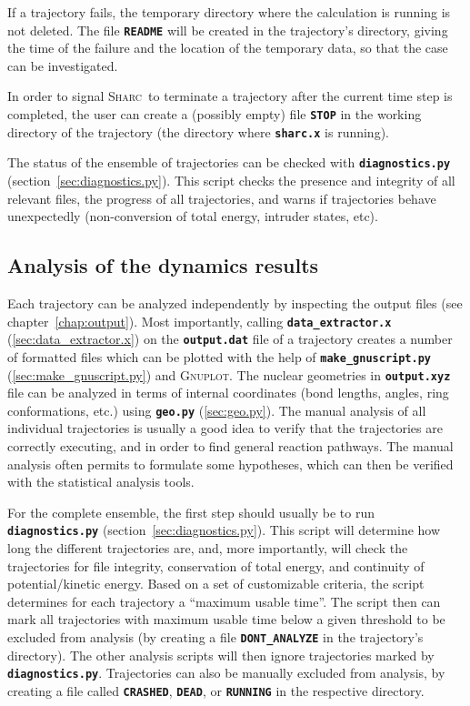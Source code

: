 \documentclass[a4paper,10pt,DIV=15,openany]{scrbook}
\newcommand{\sharc}{\textsc{Sharc}}
\newcommand{\ttt}[1]{\textbf{\texttt{#1}}}
\begin{document}
If a trajectory fails, the temporary directory where the calculation is running is not deleted. The file \ttt{README} will be created in the trajectory's directory, giving the time of the failure and the location of the temporary data, so that the case can be investigated. 

In order to signal \sharc\ to terminate a trajectory after the current time step is completed, the user can create a (possibly empty) file \ttt{STOP} in the working directory of the trajectory (the directory where \ttt{sharc.x} is running).

The status of the ensemble of trajectories can be checked with \ttt{diagnostics.py} (section~\ref{sec:diagnostics.py}). This script checks the presence and integrity of all relevant files, the progress of all trajectories, and warns if trajectories behave unexpectedly (non-conversion of total energy, intruder states, etc).

\subsection{Analysis of the dynamics results}

Each trajectory can be analyzed independently by inspecting the output files (see chapter~\ref{chap:output}). Most importantly, calling \ttt{data\_extractor.x} (\ref{sec:data_extractor.x}) on the \ttt{output.dat} file of a trajectory creates a number of formatted files which can be plotted with the help of \ttt{make\_gnuscript.py} (\ref{sec:make_gnuscript.py}) and \textsc{Gnuplot}.
The nuclear geometries in \ttt{output.xyz} file can be analyzed in terms of internal coordinates (bond lengths, angles, ring conformations, etc.) using \ttt{geo.py} (\ref{sec:geo.py}).
The manual analysis of all individual trajectories is usually a good idea to verify that the trajectories are correctly executing, and in order to find general reaction pathways.
The manual analysis often permits to formulate some hypotheses, which can then be verified with the statistical analysis tools.

For the complete ensemble, the first step should usually be to run \ttt{diagnostics.py} (section~\ref{sec:diagnostics.py}).
This script will determine how long the different trajectories are, and, more importantly, will check the trajectories for file integrity, conservation of total energy, and continuity of potential/kinetic energy.
Based on a set of customizable criteria, the script determines for each trajectory a ``maximum usable time''.
The script then can mark all trajectories with maximum usable time below a given threshold to be excluded from analysis (by creating a file \ttt{DONT\_ANALYZE} in the trajectory's directory).
The other analysis scripts will then ignore trajectories marked by \ttt{diagnostics.py}.
Trajectories can also be manually excluded from analysis, by creating a file called \ttt{CRASHED}, \ttt{DEAD}, or \ttt{RUNNING} in the respective directory.
\end{document}
